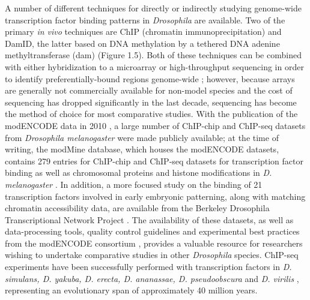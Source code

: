 A number of different techniques for directly or indirectly studying genome-wide transcription factor binding patterns in \emph{Drosophila} are available. Two of the primary \emph{in vivo} techniques are ChIP (chromatin immunoprecipitation) and DamID, the latter based on DNA methylation by a tethered DNA adenine methyltransferase (dam) \citep{greil_[16]_2006} (Figure 1.5). Both of these techniques can be combined with either hybridization to a microarray or high-throughput sequencing in order to identify preferentially-bound regions genome-wide \citep{aleksic_chiping_2009,van_steensel_chromatin_2001}; however, because arrays are generally not commercially available for non-model species and the cost of sequencing has dropped significantly in the last decade, sequencing has become the method of choice for most comparative studies. With the publication of the modENCODE data in 2010 \citep{the_modencode_consortium_identification_2010}, a large number of ChIP-chip and ChIP-seq datasets from \emph{Drosophila melanogaster} were made publicly available; at the time of writing, the modMine database, which houses the modENCODE datasets, contains 279 entries for ChIP-chip and ChIP-seq datasets for transcription factor binding as well as chromosomal proteins and histone modifications in \emph{D. melanogaster} \citep{contrino_modmine:_2011}. In addition, a more focused study on the binding of 21 transcription factors involved in early embryonic patterning, along with matching chromatin accessibility data, are available from the Berkeley Drosophila Transcriptional Network Project \citep{macarthur_developmental_2009}. The availability of these datasets, as well as data-processing tools, quality control guidelines and experimental best practices from the modENCODE consortium \citep{landt_chip-seq_2012,trinh_cloud-based_2013}, provides a valuable resource for researchers wishing to undertake comparative studies in other \emph{Drosophila} species. ChIP-seq experiments have been successfully performed with transcription factors in \emph{D. simulans, D. yakuba, D. erecta, D. ananassae, D. pseudoobscura} and \emph{D. virilis} \citep{bradley_binding_2010,he_high_2011,paris_extensive_2013,villar_evolution_2014}, representing an evolutionary span of approximately 40 million years.

